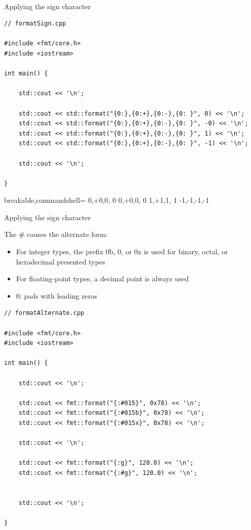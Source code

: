 \hspace*{\fill} \\ %
\noindent
Applying the sign character
\begin{lstlisting}[style=styleCXX]
// formatSign.cpp

#include <fmt/core.h>
#include <iostream>

int main() {
	
	std::cout << '\n';
	
	std::cout << std::format("{0:},{0:+},{0:-},{0: }", 0) << '\n';
	std::cout << std::format("{0:},{0:+},{0:-},{0: }", -0) << '\n';
	std::cout << std::format("{0:},{0:+},{0:-},{0: }", 1) << '\n';
	std::cout << std::format("{0:},{0:+},{0:-},{0: }", -1) << '\n';
	
	std::cout << '\n';
	
}
\end{lstlisting}

\begin{tcblisting}{breakable,commandshell={}}
0,+0,0, 0
0,+0,0, 0
1,+1,1, 1
-1,-1,-1,-1
\end{tcblisting}

\begin{center}
Applying the sign character
\end{center}

The \# causes the alternate form:

\begin{itemize}
\item 
For integer types, the prefix 0b, 0, or 0x is used for binary, octal, or hexadecimal presented types

\item 
For floating-point types, a decimal point is always used

\item 
0: pads with leading zeros
\end{itemize}

\begin{lstlisting}[style=styleCXX]
// formatAlternate.cpp

#include <fmt/core.h>
#include <iostream>

int main() {

	std::cout << '\n';
	
	std::cout << fmt::format("{:#015}", 0x78) << '\n';
	std::cout << fmt::format("{:#015b}", 0x78) << '\n';
	std::cout << fmt::format("{:#015x}", 0x78) << '\n';
	
	std::cout << '\n';
	
	std::cout << fmt::format("{:g}", 120.0) << '\n';
	std::cout << fmt::format("{:#g}", 120.0) << '\n';
	
	
	std::cout << '\n';

}
\end{lstlisting}

